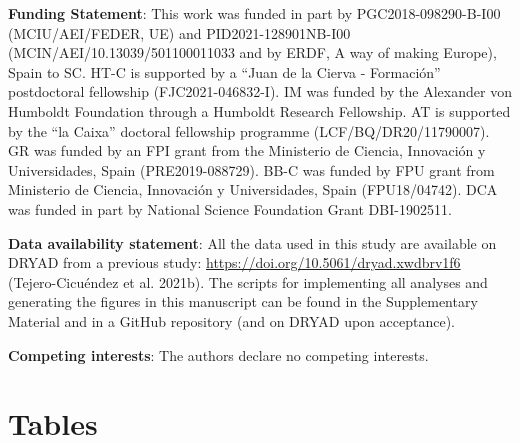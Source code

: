 \documentclass[
  11pt,
]{article}
\providecommand{\DIFaddbegin}{} %
\newcommand{\DIFaddincludegraphics}[2][]{{\color{blue}\fbox{\DIFOincludegraphics[#1]{#2}}}} %
\DeclareRobustCommand{\DIFaddbegin}{\DIFOaddbegin \let\includegraphics\DIFaddincludegraphics} %
\begin{document}
\textbf{Funding Statement}: This work was funded in part by
PGC2018-098290-B-I00 (MCIU/AEI/FEDER, UE) and PID2021-128901NB-I00
(MCIN/AEI/10.13039/501100011033 and by ERDF, A way of making Europe),
Spain to SC. HT-C is supported by a ``Juan de la Cierva - Formación''
postdoctoral fellowship (FJC2021-046832-I). IM was funded by the
Alexander von Humboldt Foundation through a Humboldt Research
Fellowship. AT is supported by the ``la Caixa'' doctoral fellowship
programme (LCF/BQ/DR20/11790007). GR was funded by an FPI grant from the
Ministerio de Ciencia, Innovación y Universidades, Spain
(PRE2019-088729). BB-C was funded by FPU grant from Ministerio de
Ciencia, Innovación y Universidades, Spain (FPU18/04742). DCA was funded
in part by National Science Foundation Grant DBI-1902511.

\textbf{Data availability statement}: All the data used in this study
are available on DRYAD from a previous study:
\url{https://doi.org/10.5061/dryad.xwdbrv1f6} (Tejero-Cicuéndez et al.
2021b). The scripts for implementing all analyses and generating the
figures in this manuscript can be found in the Supplementary Material
and in a GitHub repository (and on DRYAD upon acceptance).

\textbf{Competing interests}: The authors declare no competing
interests.

\newpage

\DIFaddbegin \hypertarget{tables}{%
\section{Tables}\label{tables}}
\end{document}
